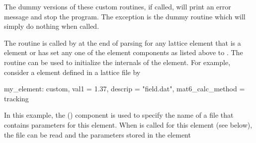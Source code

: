 The dummy versions of these custom routines, if called, will print an error message and
stop the program. The exception is the dummy  routine which will simply do
nothing when called.

The  routine is called by 
at the end of parsing for any lattice element that is a  element or has set any one of
the element components as listed above to . The  routine can be used to
initialize the internals of the element. For example, consider a  element defined in a
lattice file by
\begin{example}
  my_element: custom, val1 = 1.37, descrip = "field.dat", mat6_calc_method = tracking
\end{example}
In this example, the  () component is used
to specify the name of a file that contains parameters for this
element. When  is called for this element (see below),
the file can be read and the parameters stored in the element
